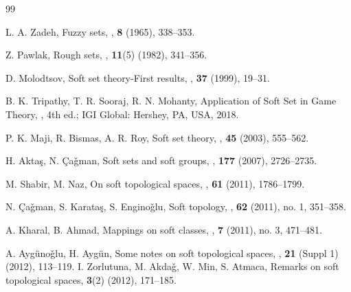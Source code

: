 \documentclass[preprint,12pt]{elsarticle}
\begin{document}
\begin{thebibliography}{99}

L. A. Zadeh, Fuzzy sets,
,
\newblock \textbf{8} (1965), 338--353.

Z. Pawlak, Rough sets,
,
\newblock \textbf{11}(5) (1982), 341--356.

D. Molodtsov, Soft set theory-First results,
,
\newblock \textbf{37} (1999), 19--31.

B. K. Tripathy, T. R. Sooraj, R. N. Mohanty, Application of Soft Set in Game Theory,
, 4th ed.; IGI Global: Hershey, PA, USA, 2018.


P. K. Maji, R. Bismas, A. R. Roy, Soft set theory,
,
\newblock \textbf{45} (2003), 555--562.

H. Akta\c{s}, N. \c{C}a\v{g}man, Soft sets and soft groups,
,
\newblock \textbf{177} (2007), 2726--2735.

M. Shabir, M. Naz, On soft topological spaces,
,
\newblock \textbf{61} (2011), 1786--1799.

N. \c{C}a\v{g}man, S. Karata\c{s}, S. Engino\v{g}lu, Soft topology,
,
\newblock \textbf{62} (2011), no. 1, 351--358.

A. Kharal, B. Ahmad, Mappings on soft classes,
,
\newblock \textbf{7} (2011), no. 3, 471--481.

A. Ayg\"{u}no\v{g}lu, H. Ayg\"{u}n, Some notes on soft topological spaces,
,
\newblock \textbf{21} (Suppl 1) (2012), 113--119.
I. Zorlutuna, M. Akda\v{g}, W. Min, S. Atmaca, Remarks on soft topological spaces,
\newblock \textbf{3}(2) (2012), 171--185.



\end{thebibliography}
\end{document}
